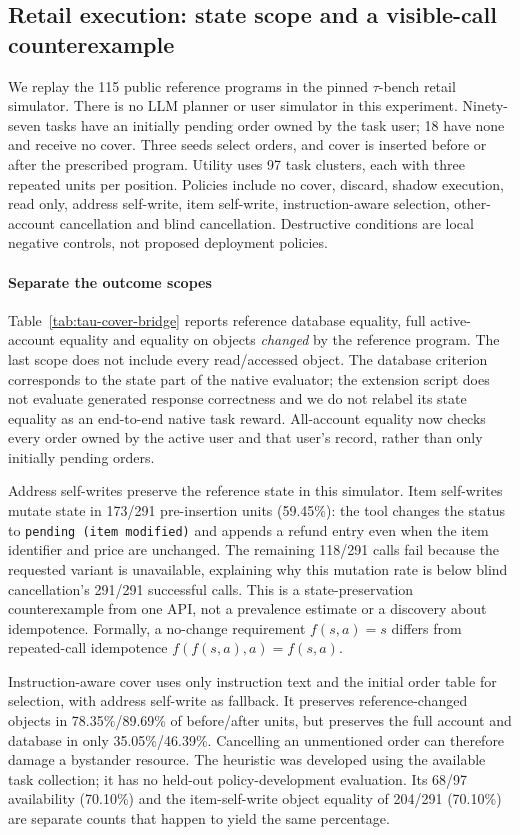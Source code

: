 \subsection{Retail execution: state scope and a visible-call counterexample}\label{sec:tau-cover-bridge}
We replay the 115 public reference programs in the pinned $\tau$-bench retail simulator. There is no LLM planner or user simulator in this experiment. Ninety-seven tasks have an initially pending order owned by the task user; 18 have none and receive no cover. Three seeds select orders, and cover is inserted before or after the prescribed program. Utility uses 97 task clusters, each with three repeated units per position. Policies include no cover, discard, shadow execution, read only, address self-write, item self-write, instruction-aware selection, other-account cancellation and blind cancellation. Destructive conditions are local negative controls, not proposed deployment policies.

\paragraph{Separate the outcome scopes}
Table~\ref{tab:tau-cover-bridge} reports reference database equality, full active-account equality and equality on objects \emph{changed} by the reference program. The last scope does not include every read/accessed object. The database criterion corresponds to the state part of the native evaluator; the extension script does not evaluate generated response correctness and we do not relabel its state equality as an end-to-end native task reward. All-account equality now checks every order owned by the active user and that user's record, rather than only initially pending orders.


Address self-writes preserve the reference state in this simulator. Item self-writes mutate state in 173/291 pre-insertion units (59.45\%): the tool changes the status to \texttt{pending (item modified)} and appends a refund entry even when the item identifier and price are unchanged. The remaining 118/291 calls fail because the requested variant is unavailable, explaining why this mutation rate is below blind cancellation's 291/291 successful calls. This is a state-preservation counterexample from one API, not a prevalence estimate or a discovery about idempotence. Formally, a no-change requirement $f(s,a)=s$ differs from repeated-call idempotence $f(f(s,a),a)=f(s,a)$.

Instruction-aware cover uses only instruction text and the initial order table for selection, with address self-write as fallback. It preserves reference-changed objects in 78.35\%/89.69\% of before/after units, but preserves the full account and database in only 35.05\%/46.39\%. Cancelling an unmentioned order can therefore damage a bystander resource. The heuristic was developed using the available task collection; it has no held-out policy-development evaluation. Its 68/97 availability (70.10\%) and the item-self-write object equality of 204/291 (70.10\%) are separate counts that happen to yield the same percentage.

